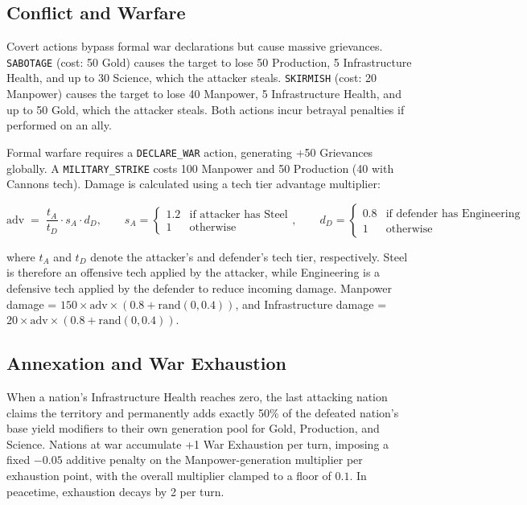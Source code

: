 \documentclass[11pt, a4paper, onecolumn]{article} %
\begin{document}
\subsection{Conflict and Warfare}

Covert actions bypass formal war declarations but cause massive grievances. \texttt{SABOTAGE} (cost: 50 Gold) causes the target to lose 50 Production, 5 Infrastructure Health, and up to 30 Science, which the attacker steals. \texttt{SKIRMISH} (cost: 20 Manpower) causes the target to lose 40 Manpower, 5 Infrastructure Health, and up to 50 Gold, which the attacker steals. Both actions incur betrayal penalties if performed on an ally.

Formal warfare requires a \texttt{DECLARE\_WAR} action, generating +50 Grievances globally. A \texttt{MILITARY\_\allowbreak STRIKE} costs 100 Manpower and 50 Production (40 with Cannons tech). Damage is calculated using a tech tier advantage multiplier:

\[
\text{adv} \;=\; \frac{t_A}{t_D} \cdot s_A \cdot d_D,
\qquad
s_A = \begin{cases} 1.2 & \text{if attacker has Steel} \\ 1 & \text{otherwise} \end{cases},
\qquad
d_D = \begin{cases} 0.8 & \text{if defender has Engineering} \\ 1 & \text{otherwise} \end{cases}
\]

where $t_A$ and $t_D$ denote the attacker's and defender's tech tier,
respectively. Steel is therefore an offensive tech applied by the attacker,
while Engineering is a defensive tech applied by the defender to reduce
incoming damage. Manpower damage = $150 \times \text{adv} \times (0.8 + \text{rand}(0,0.4))$, and Infrastructure damage = $20 \times \text{adv} \times (0.8 + \text{rand}(0,0.4))$.

\subsection{Annexation and War Exhaustion}
\label{sec:annexation}

When a nation's Infrastructure Health reaches zero, the last attacking nation claims the territory and permanently adds exactly 50\% of the defeated nation's base yield modifiers to their own generation pool for Gold, Production, and Science. Nations at war accumulate +1 War Exhaustion per turn, imposing a fixed $-0.05$ additive penalty on the Manpower-generation multiplier per exhaustion point, with the overall multiplier clamped to a floor of $0.1$. In peacetime, exhaustion decays by 2 per turn.
\end{document}
